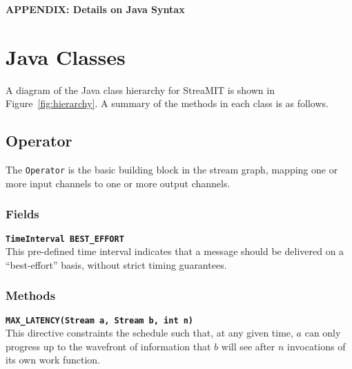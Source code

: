 \clearpage

\newcommand{\doc}[1]{{\bf {\tt #1}} \vspace{3pt} \\}

\renewcommand{\theequation}{A-\arabic{equation}}
\setcounter{equation}{0}  %
\setcounter{section}{0}

\begin{center}
{\bf APPENDIX:  Details on Java Syntax}
\end{center}

\section{Java Classes}

%

A diagram of the Java class hierarchy for StreaMIT is shown in
Figure~\ref{fig:hierarchy}.  A summary of the methods in each class is
as follows.

\subsection{Operator}

The {\tt Operator} is the basic building block in the stream graph,
mapping one or more input channels to one or more output channels.

\subsubsection{Fields}

\doc{TimeInterval BEST\_EFFORT}  This pre-defined time interval
indicates that a message should be delivered on a ``best-effort''
basis, without strict timing guarantees.

\subsubsection{Methods}

\doc{MAX\_LATENCY(Stream a, Stream b, int n)}  This directive
constraints the schedule such that, at any given time, $a$ can only
progress up to the wavefront of information that $b$ will see after
$n$ invocations of its own work function.

